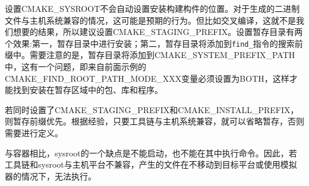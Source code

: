 设置CMAKE\_SYSROOT不会自动设置安装构建构件的位置。对于生成的二进制文件与主机系统兼容的情况，这可能是预期的行为。但比如交叉编译，这就不是我们想要的结果，所以建议设置CMAKE\_STAGING\_PREFIX。设置暂存目录有两个效果:第一，暂存目录中进行安装；第二，暂存目录将添加到\texttt{find\_}指令的搜索前缀中。需要注意的是，暂存目录将添加到CMAKE\_SYSTEM\_PREFIX\_PATH中，这有一个问题，即来自前面示例的CMAKE\_FIND\_ROOT\_PATH\_MODE\_XXX变量必须设置为BOTH，这样才能找到安装在暂存区域中的包、库和程序。

\begin{tcolorbox}[colback=blue!5!white,colframe=blue!75!black,title=CMAKE\_STAGING\_PREFIX和CMAKE\_INSTALL\_PREFIX]
若同时设置了CMAKE\_STAGING\_PREFIX和CMAKE\_INSTALL\_PREFIX，则暂存前缀优先。根据经验，只要工具链与主机系统兼容，就可以省略暂存，否则需要进行定义。
\end{tcolorbox}

与容器相比，sysroot的一个缺点是不能启动，也不能在其中执行命令。因此，若工具链和sysroot与主机平台不兼容，产生的文件在不移动到目标平台或使用模拟器的情况下，无法执行。





























